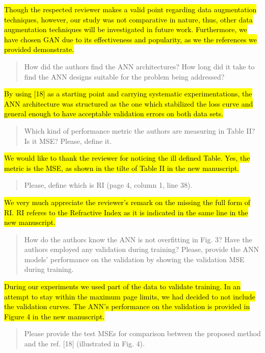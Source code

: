 \documentclass{article}
\begin{document}
	\hl{Though the respected reviewer makes a valid point regarding data augmentation techniques, however, our study was not comparative in nature, thus, other data augmentation techniques will be investigated in future work. Furthermore, we have chosen GAN due to its effectiveness and popularity, as we the references we provided demonstrate.}
	
	\begin{quote}
	How did the authors find the ANN architectures? How long did it take to find the ANN designs suitable for the problem being addressed?
	\end{quote}
	
	\hl{By using [18] as a starting point and carrying systematic experimentations, the ANN architecture was structured as the one which stabilized the loss curve and general enough to have acceptable validation errors on both data sets.}
	
	\begin{quote}
	Which kind of performance metric the authors are measuring in Table II? Is it MSE? Please, define it.
	\end{quote}
	
	\hl{We would like to thank the reviewer for noticing the ill defined Table. Yes, the metric is the MSE, as shown in the tilte of Table II in the new manuscript.}
	
	\begin{quote}
	Please, define which is RI (page 4, column 1, line 38).
	\end{quote}
	
	\hl{We very much appreciate the reviewer's remark on the missing the full form of RI. RI referes to the Refractive Index as it is indicated in the same line in the new manuscript. }	
	
	
	\begin{quote}
	How do the authors know the ANN is not overfitting in Fig. 3? Have the authors employed any validation during training? Please, provide the ANN models' performance on the validation by showing the validation MSE during training.
	\end{quote}
	
	\hl{During our experiments we used part of the data to validate training. In an attempt to stay within the maximum page limits, we had decided to not include the validation curves.
	 The ANN's performance on the validation is provided in Figure 4 in the new manuscript.}
	
	\begin{quote}
	Please provide the test MSEs for comparison between the proposed method and the ref. [18] (illustrated in Fig. 4).
	\end{quote}
	
\end{document}
